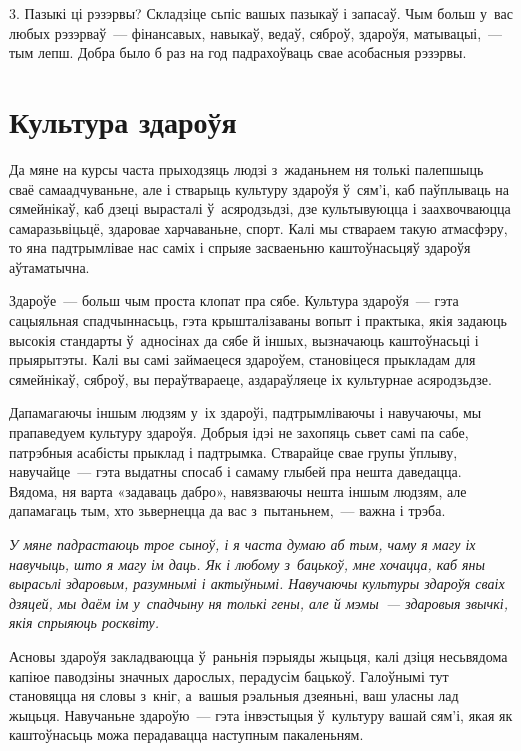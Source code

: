 3. Пазыкі ці рэзэрвы? Складзіце сьпіс вашых пазыкаў і запасаў. Чым больш у~вас любых рэзэрваў~--- фінансавых, навыкаў, ведаў, сяброў, здароўя, матывацыі,~--- тым лепш. Добра было б раз на год падрахоўваць свае асобасныя рэзэрвы.


\section{Культура здароўя}

Да мяне на курсы часта прыходзяць людзі з~жаданьнем ня толькі палепшыць сваё самаадчуваньне, але і стварыць культуру здароўя ў~сям'і, каб паўплываць на сямейнікаў, каб дзеці вырасталі ў~асяродзьдзі, дзе культывуюцца і заахвочваюцца самаразьвіцьцё, здаровае харчаваньне, спорт. Калі мы ствараем такую атмасфэру, то яна падтрымлівае нас саміх і спрыяе засваеньню каштоўнасьцяў здароўя аўтаматычна. 


Здароўе~--- больш чым проста клопат пра сябе. Культура здароўя~--- гэта сацыяльная спадчыннасьць, гэта крышталізаваны вопыт і практыка, якія задаюць высокія стандарты ў~адносінах да сябе й іншых, вызначаюць каштоўнасьці і прыярытэты. Калі вы самі займаецеся здароўем, становіцеся прыкладам для сямейнікаў, сяброў, вы пераўтвараеце, аздараўляеце іх культурнае асяродзьдзе.

Дапамагаючы іншым людзям у~іх здароўі, падтрымліваючы і навучаючы, мы прапаведуем культуру здароўя. Добрыя ідэі не захопяць сьвет самі па сабе, патрэбныя асабісты прыклад і падтрымка. Стварайце свае групы ўплыву, навучайце~--- гэта выдатны спосаб і самаму глыбей пра нешта даведацца. Вядома, ня варта «задаваць дабро», навязваючы нешта іншым людзям, але дапамагаць тым, хто зьвернецца да вас з~пытаньнем,~--- важна і трэба.

\emph{У мяне падрастаюць трое сыноў, і я часта думаю аб тым, чаму я магу іх навучыць, што я магу ім даць. Як і любому з~бацькоў, мне хочацца, каб яны вырасьлі здаровым, разумнымі і актыўнымі. Навучаючы культуры здароўя сваіх дзяцей, мы даём ім у~спадчыну ня толькі гены, але й мэмы~--- здаровыя звычкі, якія спрыяюць росквіту.}


Асновы здароўя закладваюцца ў~раньнія пэрыяды жыцьця, калі дзіця несьвядома капіюе паводзіны значных дарослых, перадусім бацькоў. Галоўнымі тут становяцца ня словы з~кніг, а~вашыя рэальныя дзеяньні, ваш уласны лад жыцьця. Навучаньне здароўю~--- гэта інвэстыцыя ў~культуру вашай сям'і, якая як каштоўнасьць можа перадавацца наступным пакаленьням.

